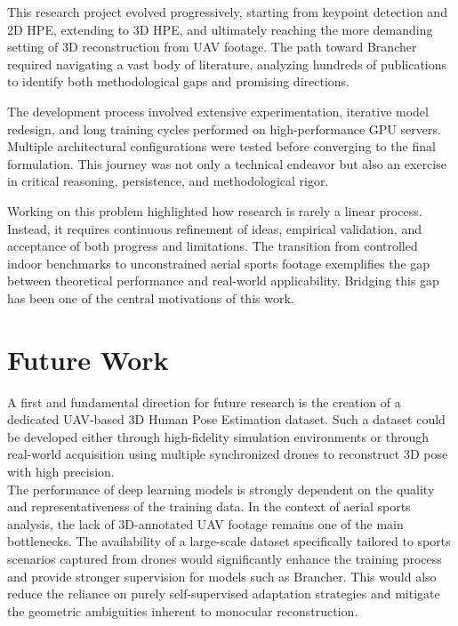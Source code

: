 This research project evolved progressively, starting from keypoint detection and 2D HPE, extending to 3D HPE, and ultimately reaching the more demanding setting of 3D reconstruction from 
UAV footage. The path toward Brancher required navigating a vast body of literature, analyzing hundreds of publications to identify both methodological gaps and promising directions. 

The development process involved extensive experimentation, iterative model redesign, and long training cycles performed on high-performance GPU servers. Multiple architectural configurations were tested 
before converging to the final formulation. This journey was not only a technical endeavor but also an exercise in critical reasoning, persistence, and methodological rigor.

Working on this problem highlighted how research is rarely a linear process. Instead, it requires continuous refinement of ideas, empirical validation, and acceptance of both progress and limitations. The 
transition from controlled indoor benchmarks to unconstrained aerial sports footage exemplifies the gap between theoretical performance and real-world applicability. Bridging this gap has been one of the 
central motivations of this work.

\section{Future Work}
A first and fundamental direction for future research is the creation of a dedicated UAV-based 3D Human Pose Estimation dataset. Such a dataset could be developed either through high-fidelity simulation environments or through 
real-world acquisition using multiple synchronized drones to reconstruct 3D pose with high precision. \\
The performance of deep learning models is strongly dependent on the quality and representativeness of the training data. In the context of aerial sports analysis, the lack of 3D-annotated UAV footage remains one of the main 
bottlenecks. The availability of a large-scale dataset specifically tailored to sports scenarios captured from drones would significantly enhance the training process and provide stronger supervision for models such as Brancher. 
This would also reduce the reliance on purely self-supervised adaptation strategies and mitigate the geometric ambiguities inherent to monocular reconstruction.

